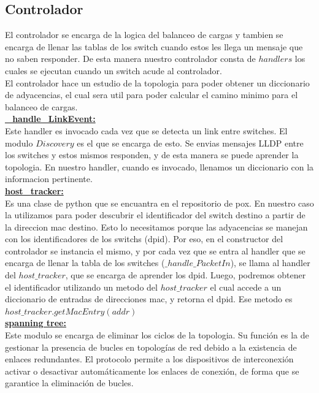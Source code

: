 \subsection{Controlador}
	El controlador se encarga de la logica del balanceo de cargas y tambien se encarga de llenar las tablas de los switch cuando estos les 		llega un mensaje que no saben responder. De esta manera nuestro controlador consta de $handlers$ los cuales se ejecutan cuando un 		switch acude al controlador.\\
	El controlador hace un estudio de la topologia para poder obtener un diccionario de adyacencias, el cual sera util para poder calcular 		el camino minimo para el balanceo de cargas.\\
	\underline{\textbf{\_handle\_LinkEvent:}}\\
		Este handler es invocado cada vez que se detecta un link entre switches. El modulo $Discovery$ es el que se encarga de esto. Se 		envias mensajes LLDP entre los switches y estos mismos responden, y de esta manera se puede aprender la topologia. En nuestro 			handler, cuando es invocado, llenamos un diccionario con la informacion pertinente.\\
	\underline{\textbf{host\_tracker:}}\\
		Es una clase de python que se encuantra en el repositorio de pox. En nuestro caso la utilizamos para poder descubrir el 		identificador del switch destino a partir de la direccion mac destino. Esto lo necesitamos porque las adyacencias se manejan 			con los identificadores de los switchs (dpid). Por eso, en el constructor del controlador se instancia el mismo, y por cada vez 		que se entra al handler que se encarga de llenar la tabla de los switches ($\_handle\_PacketIn$), se llama al handler del 			$host\_tracker$, que se encarga de aprender los dpid. Luego, podremos obtener el identificador utilizando un metodo del 		$host\_tracker$ el cual accede a un diccionario de entradas de direcciones mac, y retorna el dpid. 
		Ese metodo es $host\_tracker.getMacEntry(addr)$\\
	\underline{\textbf{spanning tree:}}\\
		Este modulo se encarga de eliminar los ciclos de la topologia. Su función es la de gestionar la presencia de bucles en 			topologías de red debido a la existencia de enlaces redundantes. El protocolo permite a los dispositivos de interconexión 			activar o desactivar automáticamente los enlaces de conexión, de forma que se garantice la eliminación de bucles.\\
